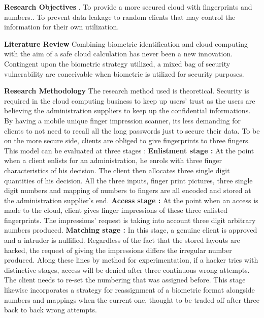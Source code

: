 \documentclass[12pt]{article}
\begin{document}
\textbf{\large Research Objectives} \newline {}.  To provide a more secured cloud with fingerprints and numbers.\newline {}.  To prevent data leakage to random clients that may control the information for their own utilization. \newline \newline

\textbf{\large Literature Review} \newline \newline
Combining biometric identification and cloud computing with the aim of a safe cloud calculation has never been a new innovation. Contingent upon the biometric strategy utilized, a mixed bag of security vulnerability are conceivable when biometric is utilized for security purposes.  \newpage

\textbf{\large Research Methodology} \newline \newline
The research method used is theoretical. Security is required in the cloud computing business to keep up users' trust as the users are believing the administration suppliers to keep up the confidential informations. By having a mobile unique finger impression scanner, its less demanding for clients to not need to recall all the long passwords just to secure their data. To be on the more secure side, clients are obliged to give fingerprints to three fingers. This model can be evaluated at three stages : \newline \newline
\textbf {Enlistment stage : } At the point when a client enlists for an administration, he enrols with three finger characteristics of his decision. The client then allocates three single digit quantities of his decision. All the three inputs, finger print pictures, three single digit numbers and mapping of numbers to fingers are all encoded and stored at the administration supplier's end. \newline \newline
\textbf {Access stage : } At the point when an access is made to the cloud, client gives finger impressions of these three enlisted fingerprints. The impressions' request is taking into account three digit arbitrary numbers produced. \newline \newline
\textbf {Matching stage : } In this stage, a genuine client is approved and a intruder is nullified. Regardless of the fact that the stored layouts are hacked, the request of giving the impressions differs the irregular number produced. Along these lines by method for experimentation, if a hacker tries with distinctive stages, access will be denied after three continuous wrong attempts. The client needs to re-set the numbering that was assigned before. This stage likewise incorporates a strategy for reassignment of a biometric format alongside numbers and mappings when the current one, thought to be traded off after three back to back wrong attempts.  \newpage
\end{document}
